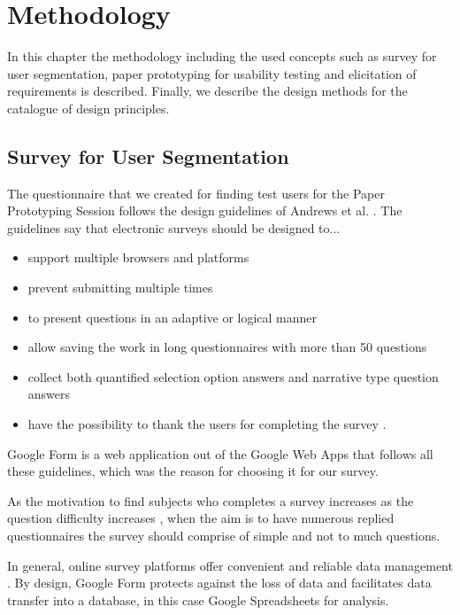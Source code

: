 \chapter{Methodology}

In this chapter the methodology including the used concepts such as survey for user segmentation, paper prototyping for usability testing and elicitation of requirements is described. Finally, we describe the design methods for the catalogue of design principles.

\section{Survey for User Segmentation}
\label{sec:survey}

The questionnaire that we created for finding test users for the Paper Prototyping Session follows the design guidelines of Andrews et al. \cite{andrews2007conducting}. The guidelines say that electronic surveys should be designed to...

\begin{itemize}
	\item support multiple browsers and platforms \cite{yun2000comparative}
	\item prevent submitting multiple times \cite{yun2000comparative}
	\item to present questions in an adaptive or logical manner \cite{kehoe1997eighth}
	\item allow saving the work in long questionnaires with more than 50 questions \cite{smith1997casting}
	\item collect both quantified selection option answers and narrative type question answers \cite{yun2000comparative}
	\item have the possibility to thank the users for completing the survey \cite{smith1997casting}.
\end{itemize}

Google Form is a web application out of the Google Web Apps that follows all these guidelines, which was the reason for choosing it for our survey.

As the motivation to find subjects who completes a survey increases as the question difficulty increases \cite{andrews2007conducting}, when the aim is to have numerous replied questionnaires the survey should comprise of simple and not to much questions.

In general, online survey platforms offer convenient and reliable data management \cite{carbonaro2000design}. By design, Google Form protects against the loss of data and facilitates data transfer into a database, in this case Google Spreadsheets for analysis.

